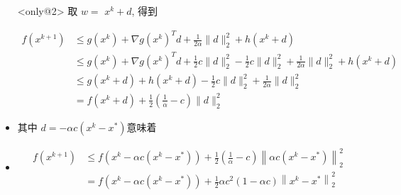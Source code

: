 \documentclass[handout]{beamer}
\begin{document}
\begin{frame}
\begin{itemize}
 \item[]<only@2>
取 $w=$ $x^{k}+d$, 得到
\begin{footnotesize}
$$
\begin{aligned}
f\left(x^{k+1}\right) & \leq g\left(x^{k}\right)+\nabla g\left(x^{k}\right)^{T} d+\frac{1}{2 \alpha}\|d\|_{2}^{2}+h\left(x^{k}+d\right) \\
& \leq g\left(x^{k}\right)+\nabla g\left(x^{k}\right)^{T} d+\frac{1}{2} c\|d\|_{2}^{2}-\frac{1}{2} c\|d\|_{2}^{2}+\frac{1}{2 \alpha}\|d\|_{2}^{2}+h(x^{k}+d) \\
& \leq g\left(x^{k}+d\right)+h\left(x^{k}+d\right)-\frac{1}{2} c\|d\|_{2}^{2}+\frac{1}{2 \alpha}\|d\|_{2}^{2} \\
&=f\left(x^{k}+d\right)+\frac{1}{2}\left(\frac{1}{\alpha}-c\right)\|d\|_{2}^{2}
\end{aligned}
$$

\end{footnotesize}


		
\item 其中 $d=-\alpha c\left(x^{k}-x^{*}\right)$意味着
\item 
\begin{equation}
\begin{aligned}
f\left(x^{k+1}\right) & \leq f\left(x^{k}-\alpha c\left(x^{k}-x^{*}\right)\right)+\frac{1}{2}\left(\frac{1}{\alpha}-c\right)\left\|\alpha c\left(x^{k}-x^{*}\right)\right\|_{2}^{2} \\
&=f\left(x^{k}-\alpha c\left(x^{k}-x^{*}\right)\right)+\frac{1}{2} \alpha c^{2}(1-\alpha c)\left\|x^{k}-x^{*}\right\|_{2}^{2}
\end{aligned}
\end{equation}

\end{itemize}
\end{frame}
\end{document}
